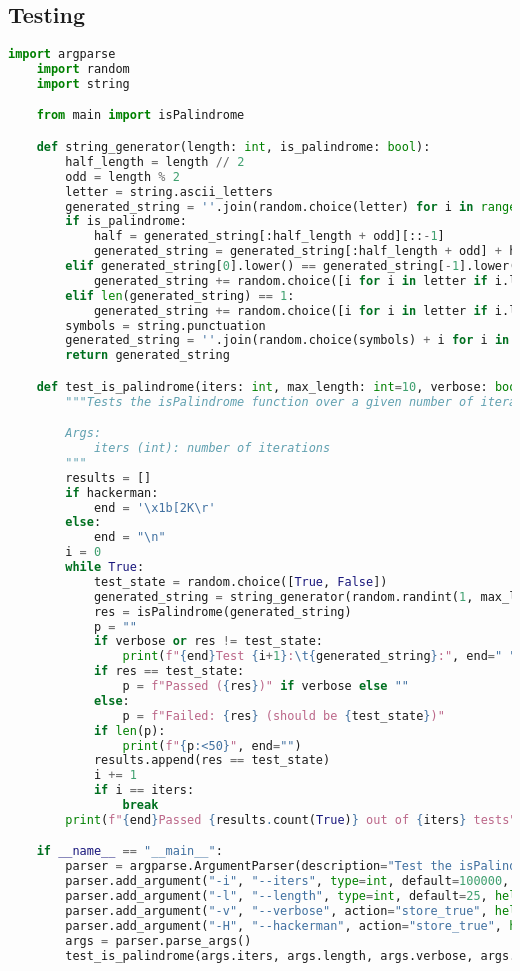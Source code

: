 \documentclass{report}
\begin{document}
\subsection{Testing}
\begin{lstlisting}[language=python]
	import argparse
	import random
	import string

	from main import isPalindrome

	def string_generator(length: int, is_palindrome: bool):
		half_length = length // 2
		odd = length % 2
		letter = string.ascii_letters
		generated_string = ''.join(random.choice(letter) for i in range(length))
		if is_palindrome:
			half = generated_string[:half_length + odd][::-1]
			generated_string = generated_string[:half_length + odd] + half
		elif generated_string[0].lower() == generated_string[-1].lower():
			generated_string += random.choice([i for i in letter if i.lower() != generated_string[0].lower()])
		elif len(generated_string) == 1:
			generated_string += random.choice([i for i in letter if i.lower() != generated_string[0].lower()])
		symbols = string.punctuation
		generated_string = ''.join(random.choice(symbols) + i for i in generated_string)
		return generated_string

	def test_is_palindrome(iters: int, max_length: int=10, verbose: bool=False, hackerman: bool=False):
		"""Tests the isPalindrome function over a given number of iterations.

		Args:
			iters (int): number of iterations
		"""
		results = []
		if hackerman:
			end = '\x1b[2K\r'
		else:
			end = "\n"
		i = 0
		while True:
			test_state = random.choice([True, False])
			generated_string = string_generator(random.randint(1, max_length), test_state)
			res = isPalindrome(generated_string)
			p = ""
			if verbose or res != test_state:
				print(f"{end}Test {i+1}:\t{generated_string}:", end=" ")
			if res == test_state:
				p = f"Passed ({res})" if verbose else ""
			else:
				p = f"Failed: {res} (should be {test_state})"
			if len(p):
				print(f"{p:<50}", end="")
			results.append(res == test_state)
			i += 1
			if i == iters:
				break
		print(f"{end}Passed {results.count(True)} out of {iters} tests")

	if __name__ == "__main__":
		parser = argparse.ArgumentParser(description="Test the isPalindrome function")
		parser.add_argument("-i", "--iters", type=int, default=100000, help="number of iterations")
		parser.add_argument("-l", "--length", type=int, default=25, help="maximum length of the string")
		parser.add_argument("-v", "--verbose", action="store_true", help="verbose mode")
		parser.add_argument("-H", "--hackerman", action="store_true", help="hackerman mode")
		args = parser.parse_args()
		test_is_palindrome(args.iters, args.length, args.verbose, args.hackerman)
\end{lstlisting}
\end{document}
